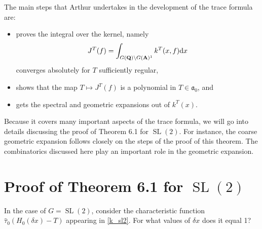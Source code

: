 \documentclass[11pt]{amsart}
\def\A{\mathbf A}
\def\Q{\mathbf Q}
\def\aaa{\mathfrak a}
\def\d{\text d}
\def\bs{\setminus}
\def\sl{\operatorname{SL}}
\theoremstyle{remark}
\begin{document}
The main steps that Arthur undertakes in the development of the trace formula are:
\begin{itemize}
	\item proves the integral over the kernel, namely
			\[ J^T(f) = \int_{G(\Q) \bs G(\A)^1} k^T(x, f) \d x \]
			converges absolutely for $T$ sufficiently regular,
	\item shows that the map $T \mapsto J^T(f)$ is a polynomial in $T \in \aaa_0$, and
	\item gets the spectral and geometric expansions out of $k^T(x)$. 
\end{itemize}
Because it covers many important aspects of the trace formula, we will go into details discussing the proof of Theorem 6.1 for $\sl(2)$. For instance, the coarse geometric expansion follows closely on the steps of the proof of this theorem. The combinatorics discussed here play an important role in the geometric expansion. 

\section{Proof of Theorem 6.1 for $\sl(2)$} \label{6.1proof}

In the case of $G = \sl(2)$, consider the characteristic function $\hat\tau_0(H_0(\delta x) - T)$ appearing in \cref{k_sl2}. For what values of $\delta x$ does it equal 1?
\end{document}
